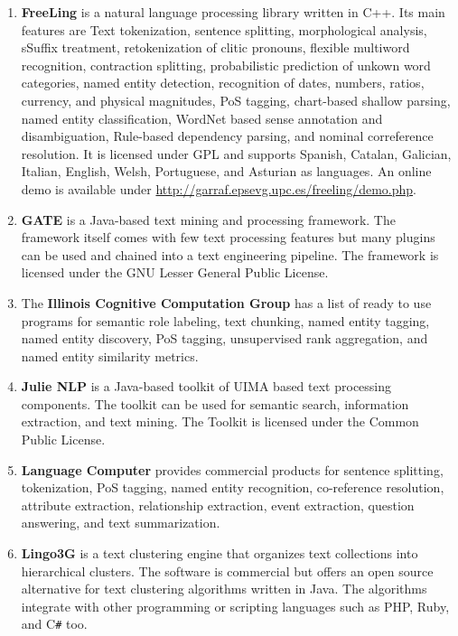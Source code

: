 \documentclass[a4paper,twoside]{book}      %
\begin{document}
\begin{enumerate}
\item \textbf{FreeLing} \cite{atserias2006freeling} is a natural language processing library written in C++. Its main features are Text tokenization, sentence splitting, morphological analysis, sSuffix treatment, retokenization of clitic pronouns, flexible multiword recognition, contraction splitting, probabilistic prediction of unkown word categories, named entity detection, recognition of dates, numbers, ratios, currency, and physical magnitudes, PoS tagging, chart-based shallow parsing, named entity classification,  WordNet based sense annotation and disambiguation, Rule-based dependency parsing, and nominal correference resolution.
It is licensed under GPL and supports Spanish, Catalan, Galician, Italian, English, Welsh, Portuguese, and Asturian as languages. An online demo is available under \url{http://garraf.epsevg.upc.es/freeling/demo.php}.
\item \textbf{GATE} \cite{cunningham2002gate} is a Java-based text mining and processing framework. The framework itself comes with few text processing features but many plugins can be used and chained into a text engineering pipeline.
The framework is licensed under the GNU Lesser General Public License.
\item The \textbf{Illinois Cognitive Computation Group} \cite{illinoisccg} has a list of ready to use programs for semantic role labeling, text chunking, named entity tagging, named entity discovery, PoS tagging, unsupervised rank aggregation, and named entity similarity metrics.
\item \textbf{Julie NLP} \cite{tomanek2007uima} is a Java-based toolkit of UIMA based text processing components. The toolkit can be used for semantic search, information extraction, and text mining.
The Toolkit is licensed under the Common Public License.
\item \textbf{Language Computer} \cite{lanuagecomputer} provides commercial products for sentence splitting, tokenization, PoS tagging, named entity recognition, co-reference resolution, attribute extraction, relationship extraction, event extraction, question answering, and text summarization.
\item \textbf{Lingo3G} \cite{lingo3g} is a text clustering engine that organizes text collections into hierarchical clusters.
The software is commercial but \cite{stefanowski2003carrot} offers an open source alternative for text clustering algorithms written in Java. The algorithms integrate with other programming or scripting languages such as PHP, Ruby, and C\verb$#$ too.

\end{enumerate}
\end{document}
